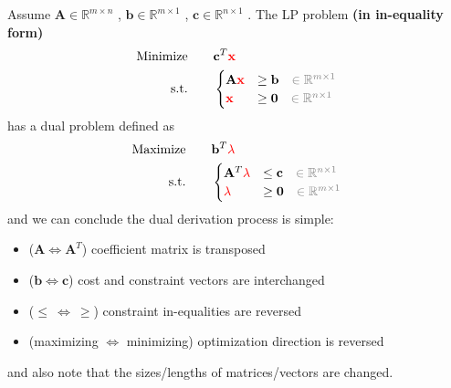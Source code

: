 \documentclass[twocolumn]{ctexart}
\begin{document}
Assume
$\mathbf{A} \in \mathbb{R}^{m \times n}$
,
$\mathbf{b} \in \mathbb{R}^{m \times 1}$
,
$\mathbf{c} \in \mathbb{R}^{n \times 1}$
.
The LP problem \textbf{\color{blue} (in in-equality form)}
\begin{equation}
    \begin{aligned}
        \label{eq:primal}
        \text{Minimize} \qquad &
            \mathbf{c}^T  \mathbf{\color{red} x}
        \\
        \text{s.t.} \qquad &
            \begin{cases}
                \mathbf{A}  \mathbf{\color{red} x}  &  \geq  \mathbf{b}  {\color{gray} \quad \in \mathbb{R}^{m \times 1}}  \\
                            \mathbf{\color{red} x}  &  \geq  \mathbf{0}  {\color{gray} \quad \in \mathbb{R}^{n \times 1}}  \\
            \end{cases}
    \end{aligned}
\end{equation}
has a dual problem defined as
\begin{equation}
    \begin{aligned}
        \label{eq:dual}
        \text{Maximize} \qquad &
            \mathbf{b}^T  \mathbf{\color{red} \lambda}
        \\
        \text{s.t.} \qquad &
            \begin{cases}
                \mathbf{A}^T  \mathbf{\color{red} \lambda}  &  \leq  \mathbf{c}  {\color{gray} \quad \in \mathbb{R}^{n \times 1}}  \\
                              \mathbf{\color{red} \lambda}  &  \geq  \mathbf{0}  {\color{gray} \quad \in \mathbb{R}^{m \times 1}}  \\
            \end{cases}
    \end{aligned}
\end{equation}
and we can conclude the dual derivation process is simple:
\begin{itemize}
    \item  ($\mathbf{A} \Leftrightarrow \mathbf{A}^T$) coefficient matrix is transposed
    \item  ($\mathbf{b} \Leftrightarrow \mathbf{c}$) cost and constraint vectors are interchanged
    \item  ($\leq \  \Leftrightarrow \  \geq$) constraint in-equalities are reversed
    \item  (maximizing $\Leftrightarrow$ minimizing) optimization direction is reversed
\end{itemize}
and also note that the sizes/lengths of matrices/vectors are changed.
\end{document}
